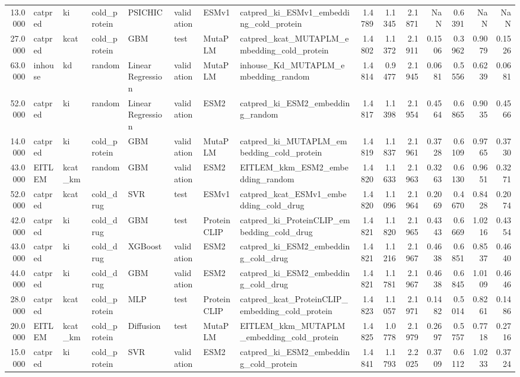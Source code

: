 \begin{tabular}{rlllllllrrrrrrr}
13.0000 & catpred & ki & cold_protein & PSICHIC & validation & ESMv1 & catpred_ki_ESMv1_embedding_cold_protein & 1.4789 & 1.1345 & 2.1871 & NaN & 0.6391 & NaN & NaN \\
27.0000 & catpred & kcat & cold_protein & GBM & test & MutaPLM & catpred_kcat_MUTAPLM_embedding_cold_protein & 1.4802 & 1.1372 & 2.1911 & 0.1506 & 0.3962 & 0.9079 & 0.1526 \\
63.0000 & inhouse & kd & random & Linear Regression & validation & MutaPLM & inhouse_Kd_MUTAPLM_embedding_random & 1.4814 & 0.9477 & 2.1945 & 0.0681 & 0.5556 & 0.6239 & 0.0681 \\
52.0000 & catpred & ki & random & Linear Regression & validation & ESM2 & catpred_ki_ESM2_embedding_random & 1.4817 & 1.1398 & 2.1954 & 0.4564 & 0.6865 & 0.9035 & 0.4566 \\
14.0000 & catpred & ki & cold_protein & GBM & validation & MutaPLM & catpred_ki_MUTAPLM_embedding_cold_protein & 1.4819 & 1.1837 & 2.1961 & 0.3728 & 0.6109 & 0.9765 & 0.3730 \\
43.0000 & EITLEM & kcat_km & random & GBM & validation & ESM2 & EITLEM_kkm_ESM2_embedding_random & 1.4820 & 1.1633 & 2.1963 & 0.3263 & 0.6130 & 0.9651 & 0.3271 \\
52.0000 & catpred & kcat & cold_drug & SVR & test & ESMv1 & catpred_kcat_ESMv1_embedding_cold_drug & 1.4820 & 1.1096 & 2.1964 & 0.2069 & 0.4670 & 0.8428 & 0.2074 \\
42.0000 & catpred & ki & cold_drug & GBM & test & ProteinCLIP & catpred_ki_ProteinCLIP_embedding_cold_drug & 1.4821 & 1.1820 & 2.1965 & 0.4343 & 0.6669 & 1.0216 & 0.4354 \\
43.0000 & catpred & ki & cold_drug & XGBoost & validation & ESM2 & catpred_ki_ESM2_embedding_cold_drug & 1.4821 & 1.1216 & 2.1967 & 0.4638 & 0.6851 & 0.8537 & 0.4640 \\
44.0000 & catpred & ki & cold_drug & GBM & validation & ESM2 & catpred_ki_ESM2_embedding_cold_drug & 1.4821 & 1.1781 & 2.1967 & 0.4638 & 0.6845 & 1.0109 & 0.4646 \\
28.0000 & catpred & kcat & cold_protein & MLP & test & ProteinCLIP & catpred_kcat_ProteinCLIP_embedding_cold_protein & 1.4823 & 1.1057 & 2.1971 & 0.1482 & 0.5014 & 0.8261 & 0.1486 \\
20.0000 & EITLEM & kcat_km & cold_protein & Diffusion & test & MutaPLM & EITLEM_kkm_MUTAPLM_embedding_cold_protein & 1.4825 & 1.0778 & 2.1979 & 0.2697 & 0.5757 & 0.7718 & 0.2716 \\
15.0000 & catpred & ki & cold_protein & SVR & validation & ESM2 & catpred_ki_ESM2_embedding_cold_protein & 1.4841 & 1.1793 & 2.2025 & 0.3709 & 0.6112 & 1.0233 & 0.3724 \\

\end{tabular}
